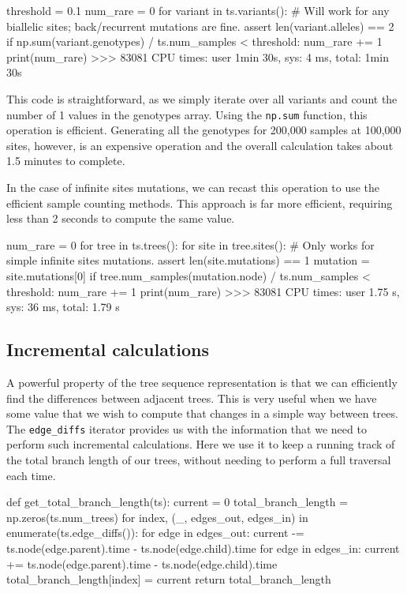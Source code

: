 \documentclass[graybox]{svmult}
\begin{document}
\begin{pythoncode}
threshold = 0.1
num_rare = 0
for variant in ts.variants():
    # Will work for any biallelic sites; back/recurrent mutations are fine.
    assert len(variant.alleles) == 2
    if np.sum(variant.genotypes) / ts.num_samples < threshold:
        num_rare += 1
print(num_rare)
>>> 83081
CPU times: user 1min 30s, sys: 4 ms, total: 1min 30s
\end{pythoncode}

This code is straightforward, as we simply iterate over all variants and
count the number of 1 values in the genotypes array. Using the \texttt{np.sum}
function, this operation is efficient. Generating all the genotypes for
200,000 samples at 100,000 sites, however,
is an expensive operation and the overall calculation takes about 1.5 minutes
to complete.

In the case of infinite sites mutations, we can recast this operation
to use the efficient sample counting methods. This approach is far more
efficient, requiring less than 2 seconds to compute the same value.
\begin{pythoncode}
num_rare = 0
for tree in ts.trees():
    for site in tree.sites():
        # Only works for simple infinite sites mutations.
        assert len(site.mutations) == 1
        mutation = site.mutations[0]
        if tree.num_samples(mutation.node) / ts.num_samples < threshold:
            num_rare += 1
print(num_rare)
>>> 83081
CPU times: user 1.75 s, sys: 36 ms, total: 1.79 s
\end{pythoncode}

    \subsection{Incremental calculations}\label{incremental-calculations}

A powerful property of the tree sequence representation is that we can
efficiently find the differences between adjacent trees. This is very
useful when we have some value that we wish to compute that changes in a
simple way between trees. The \texttt{edge\_diffs} iterator provides us
with the information that we need to perform such incremental
calculations. Here we use it to keep a running track of the total branch
length of our trees, without needing to perform a full traversal each
time.

\begin{pythoncode}
def get_total_branch_length(ts):
    current = 0
    total_branch_length = np.zeros(ts.num_trees)
    for index, (_, edges_out, edges_in) in enumerate(ts.edge_diffs()):
        for edge in edges_out:
            current -= ts.node(edge.parent).time - ts.node(edge.child).time
        for edge in edges_in:
            current += ts.node(edge.parent).time - ts.node(edge.child).time
        total_branch_length[index] = current
    return total_branch_length
\end{pythoncode}
\end{document}
